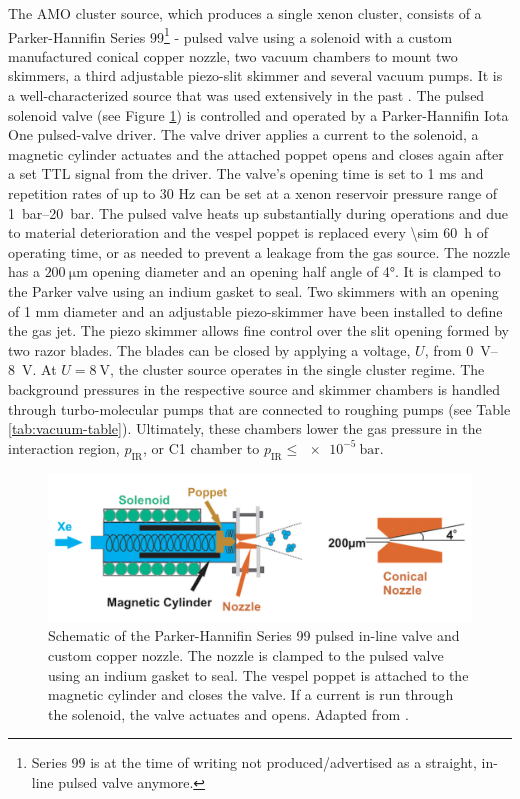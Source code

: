 The AMO cluster source, which produces a single xenon cluster, consists of a Parker-Hannifin Series 99\footnote{Series 99 is at the time of writing not produced/advertised as a straight, in-line pulsed valve anymore.} - pulsed valve using a solenoid with a custom manufactured conical copper nozzle, two vacuum chambers to mount two skimmers, a third adjustable piezo-slit skimmer and several vacuum pumps. It is a well-characterized source that was used extensively in the past \citep{Ferguson-2016-SciAdv,Ferguson-2015-JSR,Gorkhover-2012-PRL,Gorkhover-2016-NatPho,Rupp-2014-JCP}. The pulsed solenoid valve (see Figure \ref{fig:parker-valve}) is controlled and operated by a Parker-Hannifin Iota One pulsed-valve driver. The valve driver applies a current to the solenoid, a magnetic cylinder actuates and the attached poppet opens and closes again after a set TTL signal from the driver. The valve's opening time is set to 1 ms and repetition rates of up to $30$ Hz can be set at a xenon reservoir pressure range of \SIrange{1}{20}{\bar}. The pulsed valve heats up substantially during operations and due to material deterioration and the vespel poppet is replaced every \SI{\sim 60}{\hour} of operating time, or as needed to prevent a leakage from the gas source. The nozzle has a $\SI{200}{\micro\meter}$ opening diameter and an opening half angle of \ang{4}. It is clamped to the Parker valve using an indium gasket to seal. Two skimmers with an opening of 1 mm diameter and an adjustable piezo-skimmer have been installed to define the gas jet. The piezo skimmer allows fine control over the slit opening formed by two razor blades. The blades can be closed by applying a voltage, $U$, from \SIrange{0}{8}{\volt}. At $U=\SI{8}{\volt}$, the cluster source operates in the single cluster regime. The background pressures in the respective source and skimmer chambers is handled through turbo-molecular pumps that are connected to roughing pumps (see Table \ref{tab:vacuum-table}). Ultimately, these chambers lower the gas pressure in the interaction region, $p_{\text{IR}}$, or C1 chamber to $p_{\text{IR}}\leq \SI{e-5}{\bar}$.\\[1\baselineskip]
\begin{figure}
	\centering
		\includegraphics[width=1.00\textwidth]{images/parker-valve.jpg}
	\caption[Schematic of the Parker-Hannifin Series 99 valve.]{Schematic of the Parker-Hannifin Series 99 pulsed in-line valve and custom copper nozzle. The nozzle is clamped to the pulsed valve using an indium gasket to seal. The vespel poppet is attached to the magnetic cylinder and closes the valve. If a current is run through the solenoid, the valve actuates and opens. Adapted from \citep[\href{http://creativecommons.org/licenses/by-nc/3.0/us}{\ccbync}]{Ferguson-2016-PhD}.}
	\label{fig:parker-valve}
\end{figure}
